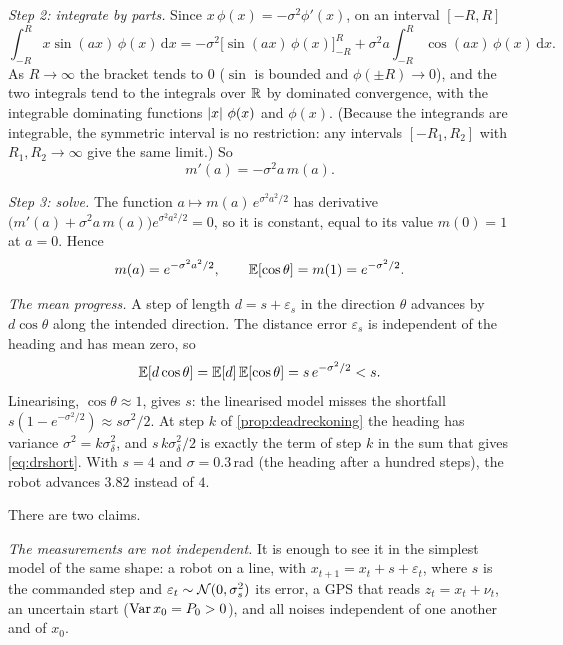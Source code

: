 \emph{Step 2: integrate by parts.} Since $x\,\phi(x)=-\sigma^2\phi'(x)$,
on an interval $[-R,R]$
\[
  \int_{-R}^{R}x\sin(ax)\,\phi(x)\,\mathrm dx
  =-\sigma^2\bigl[\sin(ax)\,\phi(x)\bigr]_{-R}^{R}
   +\sigma^2a\int_{-R}^{R}\cos(ax)\,\phi(x)\,\mathrm dx .
\]
As $R\to\infty$ the bracket tends to $0$ ($\sin$ is bounded and
$\phi(\pm R)\to0$), and the two integrals tend to the integrals over $\mathbb{R}$
by dominated convergence, with the integrable dominating functions
$\left\lvert x\right\rvert\,\phi(x)$ and $\phi(x)$. (Because the integrands are integrable,
the symmetric interval is no restriction: any intervals $[-R_1,R_2]$ with
$R_1,R_2\to\infty$ give the same limit.)
So
\[
  m'(a)=-\sigma^2a\,m(a).
\]

\emph{Step 3: solve.} The function $a\mapsto m(a)\,e^{\sigma^2a^2/2}$ has
derivative $\bigl(m'(a)+\sigma^2a\,m(a)\bigr)e^{\sigma^2a^2/2}=0$, so it
is constant, equal to its value $m(0)=1$ at $a=0$. Hence
\[
  m(a)=e^{-\sigma^2a^2/2},\qquad \mathbb{E}[\cos\theta]=m(1)=e^{-\sigma^2/2}.
\]

\emph{The mean progress.} A step of length $d=s+\varepsilon_s$ in the
direction $\theta$ advances by $d\cos\theta$ along the intended
direction. The distance error $\varepsilon_s$ is independent of the
heading and has mean zero, so
\[
  \mathbb{E}[d\cos\theta]=\mathbb{E}[d]\,\mathbb{E}[\cos\theta]=s\,e^{-\sigma^2/2}<s .
\]
Linearising, $\cos\theta\approx1$, gives $s$: the linearised model misses
the shortfall $s(1-e^{-\sigma^2/2})\approx s\sigma^2/2$. At step $k$ of
\cref{prop:deadreckoning} the heading has variance $\sigma^2=k\sigma_\delta^2$,
and $s\,k\sigma_\delta^2/2$ is exactly the term of step $k$ in the sum
that gives \eqref{eq:drshort}. With $s=4$ and $\sigma=0.3$\,rad (the
heading after a hundred steps), the robot advances $3.82$ instead of
$4$.

 There are two claims.

\emph{The measurements are not independent.} It is enough to see it in
the simplest model of the same shape: a robot on a line, with
$x_{t+1}=x_t+s+\varepsilon_t$, where $s$ is the commanded step and
$\varepsilon_t\sim\mathcal{N}(0,\sigma_s^2)$ its error, a GPS that reads
$z_t=x_t+\nu_t$, an uncertain start ($\operatorname{Var} x_0=P_0>0$), and all noises
independent of one another and of $x_0$.

